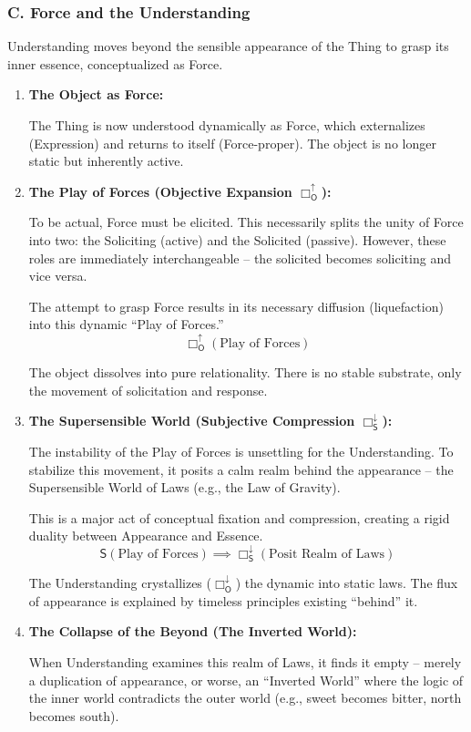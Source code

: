 \documentclass[12pt]{book}
\newcommand{\SBoxDown}{\Box_{\mathsf{S}}^{\downarrow}}
\newcommand{\OBoxUp}{\Box_{\mathsf{O}}^{\uparrow}}
\newcommand{\OBoxDown}{\Box_{\mathsf{O}}^{\downarrow}}
\begin{document}
\subsubsection{C. Force and the Understanding}

Understanding moves beyond the sensible appearance of the Thing to grasp its inner essence, conceptualized as Force.

\begin{enumerate}
\item \textbf{The Object as Force:}

The Thing is now understood dynamically as Force, which externalizes (Expression) and returns to itself (Force-proper). The object is no longer static but inherently active.

\item \textbf{The Play of Forces (Objective Expansion $\OBoxUp$):}

To be actual, Force must be elicited. This necessarily splits the unity of Force into two: the Soliciting (active) and the Solicited (passive). However, these roles are immediately interchangeable -- the solicited becomes soliciting and vice versa.

The attempt to grasp Force results in its necessary diffusion (liquefaction) into this dynamic ``Play of Forces.''
\[
\OBoxUp(\text{Play of Forces})
\]

The object dissolves into pure relationality. There is no stable substrate, only the movement of solicitation and response.

\item \textbf{The Supersensible World (Subjective Compression $\SBoxDown$):}

The instability of the Play of Forces is unsettling for the Understanding. To stabilize this movement, it posits a calm realm behind the appearance -- the Supersensible World of Laws (e.g., the Law of Gravity).

This is a major act of conceptual fixation and compression, creating a rigid duality between Appearance and Essence.
\[
\mathsf{S}(\text{Play of Forces}) \implies \SBoxDown(\text{Posit Realm of Laws})
\]

The Understanding crystallizes ($\OBoxDown$) the dynamic into static laws. The flux of appearance is explained by timeless principles existing ``behind'' it.

\item \textbf{The Collapse of the Beyond (The Inverted World):}

When Understanding examines this realm of Laws, it finds it empty -- merely a duplication of appearance, or worse, an ``Inverted World'' where the logic of the inner world contradicts the outer world (e.g., sweet becomes bitter, north becomes south).


\end{enumerate}
\end{document}
